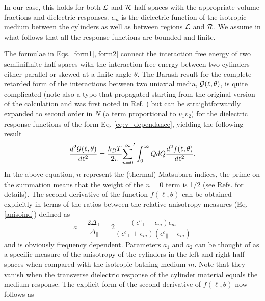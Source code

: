 \documentclass[onecolumn,letterpaper,amsmath,amssymb,floatfix,aps,superscriptaddress]{revtex4}
\begin{document}
In our case, this holds for both ${\cal L}$ and ${\cal R}$ half-spaces with the appropriate volume fractions and dielectric responses. $\epsilon_{m}$ is the dielectric function of the 
isotropic medium between the cylinders as well as between regions ${\cal L}$ and ${\cal R}$. We assume in what follows that all the response functions are bounded and finite.
 
The formulae in Eqs. \ref{form1},\ref{form2} connect the interaction free energy of two semiinifinite half spaces with the interaction free energy between two cylinders either 
parallel or skewed at a finite angle $\theta$. The Barash result \cite{Barash} for the complete retarded form of the interactions between two uniaxial media, ${\cal G}(\ell,\theta)$, 
is quite complicated (note also a typo that propagated starting from the original version of the calculation \cite{erratum} and was first noted in Ref. ) but can be straightforwardly expanded to second order 
in $N$ (a term proportional to $v_1 v_2$) for the dielectric response functions of the form Eq. \ref{eq:v_dependance}, yielding the following result
\begin{equation}
\frac{d^{2}{\cal G}(\ell,\theta)}{d\ell^{2}} = \frac{k_BT}{2\pi} {\sum_{n=0}^{\infty}}' \int_0^{\infty} Q dQ \frac{d^{2}f(\ell,\theta)}{d\ell^{2}}.
\end{equation}
In the above equation, $n$ represent the (thermal) Matsubara indices, the prime on the summation means  that the weight of the $n=0$ term is 1/2 (see Refs.  for details). The second derivative of the function $f(\ell,\theta)$ can be obtained explicitly 
in terms of the ratios between the relative anisotropy measures (Eq. \ref{anisoind}) defined as 
\begin{equation}
a = \frac{2 \Delta_{\perp}}{\Delta_{\parallel}} = 2 \frac{({\epsilon^{c}}_{\perp}-\epsilon_{m}) \epsilon_{m}}{({\epsilon^{c}}_{\perp}+\epsilon_{m}) ({\epsilon^{c}}_{\parallel}-\epsilon_{m})}
\label{eq:adef}
\end{equation}
and is obviously frequency dependent. Parameters $a_1$ and $a_2$ can be thought of as a specific measure of the anisotropy of the cylinders in the left and right half-spaces when 
compared with the isotropic bathing medium $m$. Note that they vanish when the transverse dielectric response of the cylinder material equals the medium response. 
The explicit form of the second derivative of $f(\ell,\theta)$ now follows as 
\end{document}
